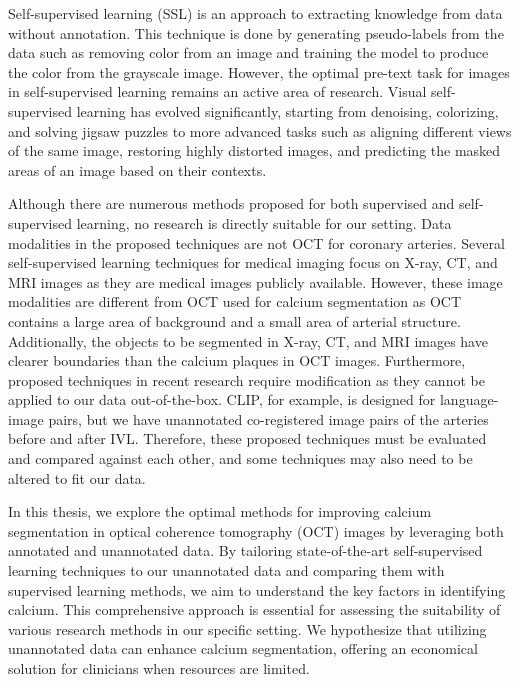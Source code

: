 \documentclass[a4paper,11pt,oneside]{report}
\begin{document}
Self-supervised learning (SSL) is an approach to extracting knowledge from data without annotation. This technique is done by generating pseudo-labels from the data such as removing color from an image and training the model to produce the color from the grayscale image. However, the optimal pre-text task for images in self-supervised learning remains an active area of research. Visual self-supervised learning has evolved significantly, starting from denoising, colorizing, and solving jigsaw puzzles to more advanced tasks such as aligning different views of the same image, restoring highly distorted images, and predicting the masked areas of an image based on their contexts. 

Although there are numerous methods proposed for both supervised and self-supervised learning, no research is directly suitable for our setting. Data modalities in the proposed techniques are not OCT for coronary arteries. Several self-supervised learning techniques for medical imaging focus on X-ray, CT, and MRI images as they are medical images publicly available. However, these image modalities are different from OCT used for calcium segmentation as OCT contains a large area of background and a small area of arterial structure. Additionally, the objects to be segmented in X-ray, CT, and MRI images have clearer boundaries than the calcium plaques in OCT images. Furthermore, proposed techniques in recent research require modification as they cannot be applied to our data out-of-the-box. CLIP, for example, is designed for language-image pairs, but we have unannotated co-registered image pairs of the arteries before and after IVL. Therefore, these proposed techniques must be evaluated and compared against each other, and some techniques may also need to be altered to fit our data. 

In this thesis, we explore the optimal methods for improving calcium segmentation in optical coherence tomography (OCT) images by leveraging both annotated and unannotated data. By tailoring state-of-the-art self-supervised learning techniques to our unannotated data and comparing them with supervised learning methods, we aim to understand the key factors in identifying calcium. This comprehensive approach is essential for assessing the suitability of various research methods in our specific setting. We hypothesize that utilizing unannotated data can enhance calcium segmentation, offering an economical solution for clinicians when resources are limited.
\end{document}
